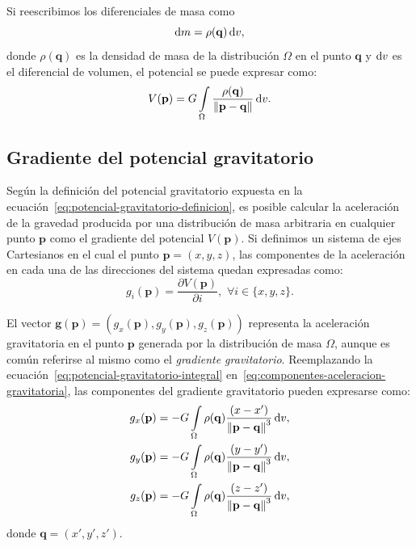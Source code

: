 Si reescribimos los diferenciales de masa como
%
\begin{equation}
    \mathop{}\!\textnormal{d} m = \rho(\mathbf{q}) \mathop{}\!\textnormal{d} v,
\end{equation}
%
donde $\rho(\mathbf{q})$ es la densidad de masa de la distribución
$\Omega$ en el punto $\mathbf{q}$ y $\mathop{}\!\textnormal{d} v$ es el diferencial de volumen,
el potencial se puede expresar como:
%
\begin{equation}
    V(\mathbf{p}) =
        G \int\limits_\Omega
        \frac{\rho(\mathbf{q})}{\left\lVert \mathbf{p} - \mathbf{q}
            \right\rVert} \mathop{}\!\textnormal{d} v.
    \label{eq:potencial-gravitatorio-integral}
\end{equation}


\subsection{Gradiente del potencial gravitatorio}

Según la definición del potencial gravitatorio expuesta en la
ecuación~\ref{eq:potencial-gravitatorio-definicion}, es posible calcular la
aceleración de la gravedad producida por una distribución de masa arbitraria
en cualquier punto $\mathbf{p}$ como el gradiente del potencial
$V(\mathbf{p})$.
Si definimos un sistema de ejes Cartesianos en el cual el punto $\mathbf{p}
= (x, y, z)$, las componentes de la aceleración en cada una de las direcciones
del sistema quedan expresadas
como:
%
\begin{equation}
    g_i(\mathbf{p}) = \frac{\partial V(\mathbf{p})}{\partial i}, \,\,
        \forall i \in \{x, y, z\}.
    \label{eq:componentes-aceleracion-gravitatoria}
\end{equation}

El vector
$\mathbf{g}(\mathbf{p}) = (g_x(\mathbf{p}), g_y(\mathbf{p}), g_z(\mathbf{p}))$
representa la aceleración gravitatoria en el punto
$\mathbf{p}$ generada por la distribución de masa $\Omega$, aunque es común
referirse al mismo como el \emph{gradiente gravitatorio}.
Reemplazando la ecuación~\ref{eq:potencial-gravitatorio-integral}
en~\ref{eq:componentes-aceleracion-gravitatoria}, las componentes del gradiente
gravitatorio pueden expresarse como:
%
\begin{align}
    g_x(\mathbf{p}) &=
        - G \int\limits_\Omega \rho(\mathbf{q})
        \frac{(x - x')}{\left\lVert \mathbf{p} - \mathbf{q} \right\rVert^3}
        \mathop{}\!\textnormal{d} v,
    \label{eq:gx-integral}
    \\
    g_y(\mathbf{p}) &=
        - G \int\limits_\Omega \rho(\mathbf{q})
        \frac{(y - y')}{\left\lVert \mathbf{p} - \mathbf{q} \right\rVert^3}
        \mathop{}\!\textnormal{d} v,
    \label{eq:gy-integral}
    \\
    g_z(\mathbf{p}) &=
        - G \int\limits_\Omega \rho(\mathbf{q})
        \frac{(z - z')}{\left\lVert \mathbf{p} - \mathbf{q} \right\rVert^3}
        \mathop{}\!\textnormal{d} v,
    \label{eq:gz-integral}
\end{align}
%
donde $\mathbf{q} = (x', y', z')$.

